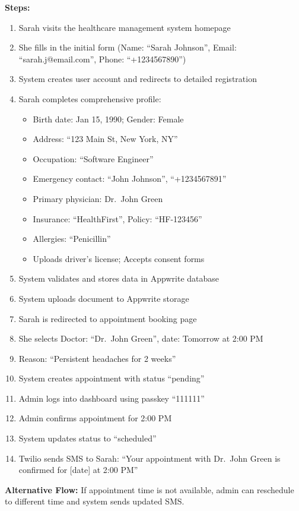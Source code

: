 \documentclass[11pt,a4paper]{article}
\begin{document}
\textbf{Steps:}
\begin{enumerate}
    \item Sarah visits the healthcare management system homepage
    \item She fills in the initial form (Name: ``Sarah Johnson'', Email: ``sarah.j@email.com'', Phone: ``+1234567890'')
    \item System creates user account and redirects to detailed registration
    \item Sarah completes comprehensive profile:
    \begin{itemize}
        \item Birth date: Jan 15, 1990; Gender: Female
        \item Address: ``123 Main St, New York, NY''
        \item Occupation: ``Software Engineer''
        \item Emergency contact: ``John Johnson'', ``+1234567891''
        \item Primary physician: Dr.\ John Green
        \item Insurance: ``HealthFirst'', Policy: ``HF-123456''
        \item Allergies: ``Penicillin''
        \item Uploads driver's license; Accepts consent forms
    \end{itemize}
    \item System validates and stores data in Appwrite database
    \item System uploads document to Appwrite storage
    \item Sarah is redirected to appointment booking page
    \item She selects Doctor: ``Dr.\ John Green'', date: Tomorrow at 2:00 PM
    \item Reason: ``Persistent headaches for 2 weeks''
    \item System creates appointment with status ``pending''
    \item Admin logs into dashboard using passkey ``111111''
    \item Admin confirms appointment for 2:00 PM
    \item System updates status to ``scheduled''
    \item Twilio sends SMS to Sarah: ``Your appointment with Dr.\ John Green is confirmed for [date] at 2:00 PM''
\end{enumerate}

\textbf{Alternative Flow:} If appointment time is not available, admin can reschedule to different time and system sends updated SMS.
\end{document}
